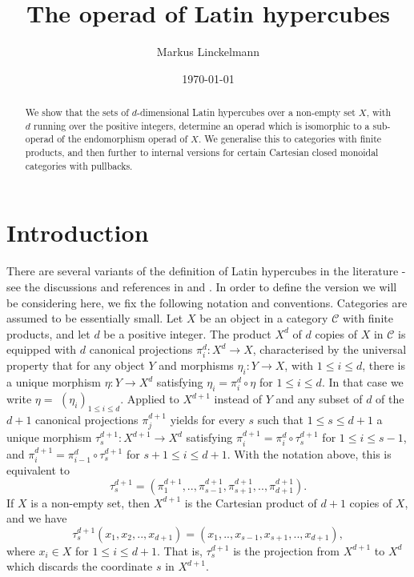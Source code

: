 \documentclass{amsart} %
\title{The operad  of Latin hypercubes } %
\author{Markus Linckelmann}
\date{\today}
\theoremstyle{plain}\newtheorem{Theorem}{Theorem}[section]
\theoremstyle{plain}\newtheorem{Conjecture}[Theorem]{Conjecture}
\theoremstyle{plain}\newtheorem{Corollary}[Theorem]{Corollary}
\theoremstyle{plain}\newtheorem{Lemma}[Theorem]{Lemma}
\theoremstyle{plain}\newtheorem{Proposition}[Theorem]{Proposition}
\theoremstyle{definition}\newtheorem{Definition}[Theorem]{Definition}
\theoremstyle{definition}\newtheorem{Example}[Theorem]{Example}
\theoremstyle{definition}\newtheorem{Examples}[Theorem]{Examples}
\theoremstyle{definition}\newtheorem{Remark}[Theorem]{Remark}
\theoremstyle{definition}\newtheorem{Remarks}[Theorem]{Remarks}
\theoremstyle{plain}\newtheorem{Statement}[Theorem]{}
\def\CC{{\mathcal{C}}}    \def\OP{{\mathcal{O}P}}
\begin{document}
\begin{abstract}
We show that the sets of $d$-dimensional Latin hypercubes over a non-empty
set $X$, with $d$ running over the positive integers, determine an operad which 
is isomorphic to a sub-operad of the endomorphism operad of $X$. We  generalise
this to categories with finite products, and then further to internal versions for certain 
Cartesian closed  monoidal categories with pullbacks. 
\end{abstract}

\maketitle


\section{Introduction} \label{introSection} 

There are several variants of the definition of Latin hypercubes in the literature - see the
discussions and references in \cite[\S 4]{BCCS} and \cite[Section 1]{McKayWan}.
In order to define the version we will be considering here, we fix the
following notation and conventions.
Categories are assumed to be essentially small.
Let $X$ be an object in a category $\CC$ with finite products, and let $d$ be a positive 
integer. The product $X^d$ of $d$ copies of $X$ in $\CC$
is equipped with $d$ canonical projections $\pi^d_i : X^d\to X$,
characterised by  the universal 
property that for any object $Y$ and morphisms $\eta_i : Y\to X$,
with $1\leq i\leq d$, there is a unique morphism $\eta : Y\to X^d$ satisfying
$\eta_i = \pi^d_i\circ \eta$ for $1 \leq i\leq d$. In that case we write 
$\eta=$ $(\eta_i)_{1\leq i\leq d}$.
Applied to $X^{d+1}$ instead of $Y$
and any subset  of $d$ of the $d+1$ canonical projections  $\pi^{d+1}_j$ yields
for every $s$ such that $1\leq s \leq d+1$ a unique morphism 
$\tau^{d+1}_s : X^{d+1} \to X^d$
satisfying 
$\pi^{d+1}_i = \pi^d_i\circ \tau^{d+1}_s$
for $1\leq i\leq s-1$, and
$\pi^{d+1}_i = \pi^d_{i-1}\circ\tau^{d+1}_s$
for $s+1 \leq i\leq d+1$. With the notation above, this is equivalent to
$$\tau^{d+1}_s= (\pi^{d+1}_1,..,\pi^{d+1}_{s-1},
\pi^{d+1}_{s+1},..,\pi^{d+1}_{d+1}). $$
If $X$ is a non-empty set, then $X^{d+1}$ is the Cartesian product of $d+1$ copies of $X$, 
and we have 
$$\tau^{d+1}_s(x_1,x_2,..,x_{d+1})= (x_1,..,x_{s-1}, x_{s+1},..,x_{d+1}),$$ 
where $x_i\in X$ for $1\leq i\leq d+1$. That is,  $\tau^{d+1}_s$
is the projection from $X^{d+1}$ to $X^d$ which discards the coordinate $s$ in $X^{d+1}$.
\end{document}
